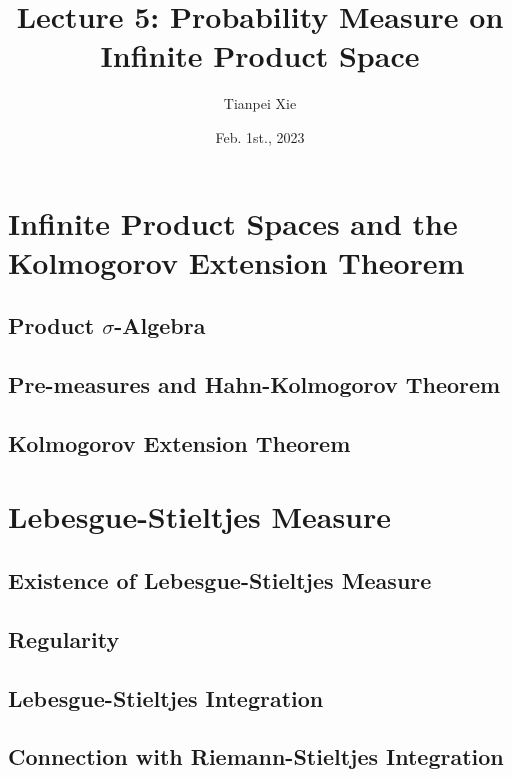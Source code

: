 \documentclass[11pt]{article}
\begin{document}
\title{Lecture 5: Probability Measure on Infinite Product Space}
\author{ Tianpei Xie}
\date{Feb. 1st., 2023}
\maketitle
\tableofcontents
\newpage
\section{Infinite Product Spaces and the Kolmogorov Extension Theorem}
\subsection{Product $\sigma$-Algebra}
\subsection{Pre-measures and Hahn-Kolmogorov Theorem}
\subsection{Kolmogorov Extension Theorem}


\section{Lebesgue-Stieltjes Measure}
\subsection{Existence of Lebesgue-Stieltjes Measure}
\subsection{Regularity}
\subsection{Lebesgue-Stieltjes Integration}
\subsection{Connection with Riemann-Stieltjes Integration}


\newpage


\end{document}
